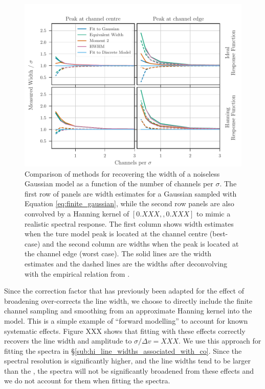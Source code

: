 \documentclass{rnaastex}
\begin{document}
\begin{figure}
\includegraphics[width=\textwidth]{width_recovery_comparison}
\caption{\label{fig:width_recovery_comparison} Comparison of methods for recovering the width of a noiseless Gaussian model as a function of the number of channels per $\sigma$. The first row of panels are width estimates for a Gaussian sampled with Equation \ref{eq:finite_gaussian}, while the second row panels are also convolved by a Hanning kernel of $[0.XXX,, 0.XXX]$ to mimic a realistic spectral response.  The first column shows width estimates when the ture model peak is located at the channel centre (best-case) and the second column are widths when the peak is located at the channel edge (worst case).  The solid lines are the width estimates and the dashed lines are the widths after deconvolving with the empirical relation from \citet{Leroy2016ApJ...831...16L}.}
\end{figure}

Since the correction factor that has previously been adapted for the effect of broadening over-corrects the line width, we choose to directly include the finite channel sampling and smoothing from an approximate Hanning kernel into the model.  This is a simple example of ``forward modelling'' to account for known systematic effects.  Figure XXX shows that fitting with these effects correctly recovers the line width and amplitude to $\sigma/\Delta v = XXX$.  We use this approach for fitting the \co spectra in \S\ref{sub:hi_line_widths_associated_with_co}.  Since the \hi spectral resolution is significantly higher, and the \hi line widths tend to be larger than the \co, the \hi spectra will not be significantly broadened from these effects and we do not account for them when fitting the \hi spectra.
\end{document}
